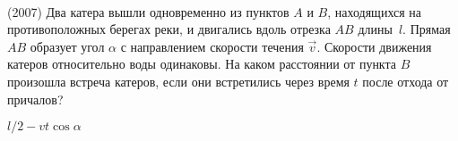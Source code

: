 \begin{ex}
\hspace{0pt} \\
\begin{minipage}{.65\textwidth}
(2007) Два катера вышли одновременно из пунктов $A$ и $B$, находящихся на противоположных берегах реки, и двигались вдоль отрезка $AB$ длины~$l$. 
Прямая $AB$ образует угол $\alpha$ с направлением скорости течения $\vec v$. Скорости движения катеров относительно воды одинаковы. 
На каком расстоянии от пункта $B$ произошла встреча катеров, если они встретились через время $t$ после отхода от причалов?
\end{minipage}
\begin{minipage}{.35\textwidth}
\centering

\end{minipage}
\begin{ans}
$l/2 - vt \cos \alpha$
\end{ans}
\end{ex}
